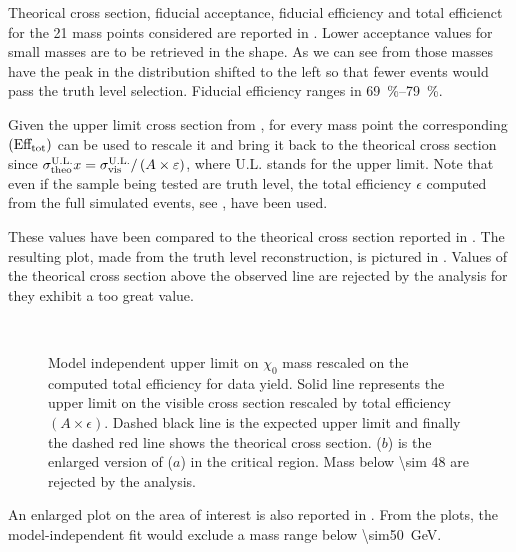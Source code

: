 Theorical cross section, fiducial acceptance, fiducial efficiency and total efficienct for the \num{21} mass points considered are reported in \Tab{\ref{tab:eff}}. Lower acceptance values for small masses are to be retrieved in the \met shape. As we can see from \Fig{\ref{fig:validation}} those masses have the peak in the \met distribution shifted to the left so that fewer events would pass the truth level selection. Fiducial efficiency ranges in \SIrange{69}{79}{\percent}.



Given the upper limit cross section from \Tab{\ref{table.results.exclxsec.pval.upperlimit.SR}}, for every mass point the corresponding $\left(\text{Eff}_\textup{tot}\right)$ can be used to rescale it and bring it back to the theorical cross section since $\sigma_\textup{theo}^\textup{U.L.}x=\sigma_\textup{vis}^\textup{U.L.}/\left(A\times\epsilon\right)$, where U.L. stands for the \sv upper limit. Note that even if the sample being tested are truth level, the total efficiency $\epsilon$ computed from the full simulated events, see \Sect{\ref{sec:full}}, have been used.

These values have been compared to the theorical cross section reported in \Tab{\ref{tab:eff}}. The resulting plot, made from the truth level reconstruction, is pictured in \Fig{\ref{subfig:exclMI}}. Values of the theorical cross section above the observed line are rejected by the analysis for they exhibit a too great value.

\begin{figure}[tp]
\centering
{} \\
 \quad
\caption{Model independent upper limit on $\chi_0$ mass rescaled on the computed total efficiency for data yield. Solid line represents the upper limit on the visible cross section rescaled by total efficiency $\left(A\times\epsilon\right)$. Dashed black line is the expected upper limit and finally the dashed red line shows the theorical cross section. ($b$) is the enlarged version of ($a$) in the critical region. Mass below \SI{\sim 48}{\gev} are rejected by the analysis.}
\label{fig:exclMI}
\end{figure}


An enlarged plot on the area of interest is also reported in  \Fig{\ref{subfig:exclMIZ}}. From the plots, the model-independent fit would exclude a mass range below \SI{\sim50}{\GeV}.

